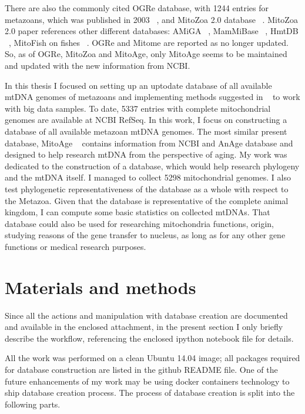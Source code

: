 \documentclass[a4paper,11pt]{article}
\begin{document}
There are also the commonly cited OGRe database, with 1244 entries for metazoans, which
was published in 2003 ~\cite{jameson2003ogre}, and MitoZoa 2.0 database ~\cite{de2012mitozoa}.
MitoZoa 2.0 paper references other different databases: AMiGA ~\cite{feijao2006amiga}, MamMiBase ~\cite{de2005mammibase}, HmtDB
~\cite{attimonelli2005hmtdb}, MitoFish on fishes ~\cite{iwasaki2013mitofish}. OGRe and Mitome are reported as no longer updated. So, as of
OGRe, MitoZoa and MitoAge, only MitoAge seems to be maintained and updated with the new
information from NCBI.

In this thesis I focused on setting up an up­to­date database of all available mtDNA genomes of
metazoans and implementing methods suggested in ~\cite{plazzi2010phylogenetic} to work with big data samples. To
date, 5337 entries with complete mitochondrial genomes are available at NCBI RefSeq. In this
work, I focus on constructing a database of all available metazoan mtDNA genomes. The most
similar present database, MitoAge ~\cite{toren2015mitoage} contains information from NCBI and AnAge database
and designed to help research mtDNA from the perspective of aging. My work was dedicated to
the construction of a database, which would help research phylogeny and the mtDNA itself. I
managed to collect 5298 mitochondrial genomes. I also test phylogenetic representativeness of
the database as a whole with respect to the Metazoa. Given that the database is representative
of the complete animal kingdom, I can compute some basic statistics on collected mtDNAs.
That database could also be used for researching mitochondria functions, origin, studying
reasons of the gene transfer to nucleus, as long as for any other gene functions or medical
research purposes.
\clearpage
\section{Materials and methods}

Since all the actions and manipulation with database creation are documented and available in
the enclosed attachment, in the present section I only briefly describe the workflow, referencing
the enclosed ipython notebook file for details.

All the work was performed on a clean Ubuntu 14.04 image; all packages required for database
construction are listed in the github README file. One of the future enhancements of my work
may be using docker containers technology to ship database creation process.
The process of database creation is split into the following parts.
\end{document}

